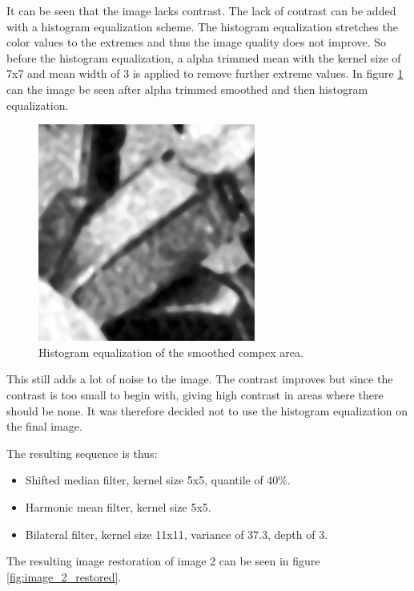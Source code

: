 It can be seen that the image lacks contrast.
The lack of contrast can be added with a histogram equalization scheme.
The histogram equalization stretches the color values to the extremes and thus the image quality does not improve.
So before the histogram equalization, a alpha trimmed mean with the kernel size of 7x7 and mean width of 3 is applied to remove further extreme values.
In figure \ref{fig:complex2_histeq_smoothed} can the image be seen after alpha trimmed smoothed and then histogram equalization.

\begin{figure}[H]
\centering
\includegraphics[width = \cutOutWidth]{graphics/complex2_histeq_smoothed.png}
\caption{Histogram equalization of the smoothed compex area.}
\label{fig:complex2_histeq_smoothed}
\end{figure}

This still adds a lot of noise to the image. 
The contrast improves but since the contrast is too small to begin with, giving high contrast in areas where there should be none.
It was therefore decided not to use the histogram equalization on the final image.

The resulting sequence is thus:
\begin{itemize}
 \item Shifted median filter, kernel size 5x5, quantile of 40\%.
 \item Harmonic mean filter, kernel size 5x5.
 \item Bilateral filter, kernel size 11x11, variance of $37.3$, depth of 3.
\end{itemize}
The resulting image restoration of image 2 can be seen in figure \ref{fig:image_2_restored}.

